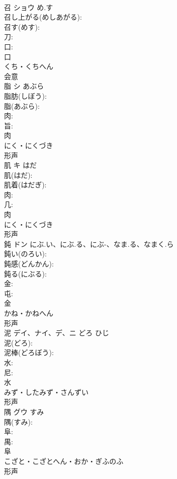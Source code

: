 \documentclass[8pt]{extreport}
\begin{document}
\begin{CJK}{UTF8}{min}
\\	召	ショウ	め.す		
\\	召し上がる(めしあがる): 
\\	召す(めす): 
\\	刀: 
\\	口: 
\\	口	
\\	くち・くちへん	
\\	会意 
\\	脂	シ	あぶら		
\\	脂肪(しぼう): 
\\	脂(あぶら): 
\\	肉: 
\\	旨: 
\\	肉	
\\	にく・にくづき	
\\	形声 
\\	肌	キ	はだ		
\\	肌(はだ): 
\\	肌着(はだぎ): 
\\	肉: 
\\	几: 
\\	肉	
\\	にく・にくづき	
\\	形声 
\\	鈍	ドン	にぶ.い、にぶ.る、にぶ-、なま.る、なまく.ら		
\\	鈍い(のろい): 
\\	鈍感(どんかん): 
\\	鈍る(にぶる): 
\\	金: 
\\	屯: 
\\	金	
\\	かね・かねへん	
\\	形声 
\\	泥	デイ、ナイ、デ、ニ	どろ	ひじ	
\\	泥(どろ): 
\\	泥棒(どろぼう): 
\\	水: 
\\	尼: 
\\	水	
\\	みず・したみず・さんずい	
\\	形声 
\\	隅	グウ	すみ		
\\	隅(すみ): 
\\	阜: 
\\	禺: 
\\	阜	
\\	こざと・こざとへん・おか・ぎふのふ	
\\	形声 

\end{CJK}
\end{document}
